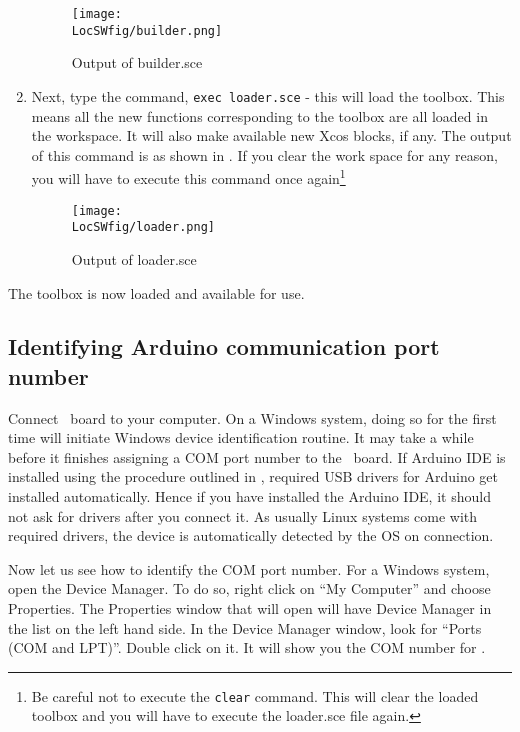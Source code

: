 \begin{enumerate}
\begin{figure}
                  \centering
                  \texttt{[image: \\LocSWfig/builder.png]}
                  \caption{Output of builder.sce}
                  \label{builder}
            \end{figure}
      \item Next, type the command,
            {\tt exec loader.sce} -
            this will load the toolbox. This means all the new functions
            corresponding to the toolbox are all loaded in the workspace. It
            will also make available new Xcos blocks, if any.  The
            output of this command is as shown in .  If you clear
            the work space for any reason, you will have to execute this command
            once again\footnote{Be careful
                  not to execute the {\tt clear} command.  This will clear the loaded
                  toolbox and you will have to execute the loader.sce file again.}
            \begin{figure}
                  \centering
                  \texttt{[image: \\LocSWfig/loader.png]}
                  \caption{Output of loader.sce}
                  \label{loader}
            \end{figure}
\end{enumerate}
The toolbox is now loaded and available for use. 

\subsection{Identifying Arduino communication port number}

Connect \arduino\ board to your computer. On a Windows system, doing
so for the first time will initiate Windows device identification
routine. It may take a while before it finishes assigning a COM port
number to the \arduino\ board.  If Arduino IDE is installed using the
procedure outlined in , required USB drivers for
Arduino get installed automatically.  Hence if you have installed the
Arduino IDE, it should not ask for drivers after you connect it.  As
usually Linux systems come with required drivers, the device is
automatically detected by the OS on connection.

Now let us see how to identify the COM port number. For a Windows
system, open the Device Manager. To do so, right click on ``My
Computer'' and choose Properties. The Properties window that will open
will have Device Manager in the list on the left hand side. In the
Device Manager window, look for ``Ports (COM and LPT)''. Double click on
it. It will show you the COM number for \arduino. 

